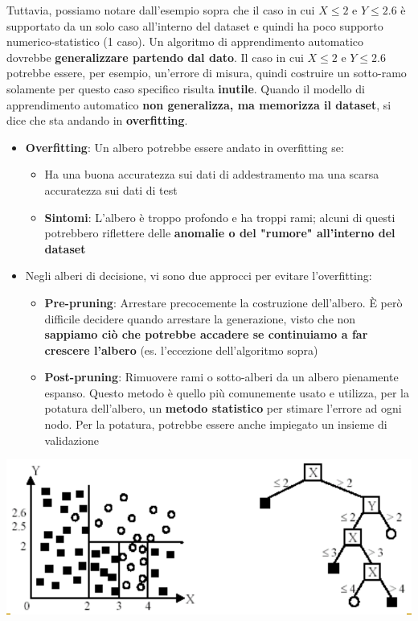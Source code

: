 \documentclass[12pt]{article}
\begin{document}
Tuttavia, possiamo notare dall'esempio sopra che il caso in cui $X \leq 2$ e $Y \leq 2.6$ è supportato da un solo caso all'interno del dataset e quindi
ha poco supporto numerico-statistico (1 caso). Un algoritmo di apprendimento automatico dovrebbe \textbf{generalizzare partendo dal dato}. Il caso in cui $X \leq 2$ e $Y \leq 2.6$ potrebbe essere, per esempio,
un'errore di misura, quindi costruire un sotto-ramo solamente per questo caso specifico risulta \textbf{inutile}.
Quando il modello di apprendimento automatico \textbf{non generalizza, ma memorizza il dataset}, si dice che sta andando in \textbf{overfitting}.
\begin{itemize}
    \item \textbf{Overfitting}: Un albero potrebbe essere andato in overfitting se:
    \begin{itemize}
        \item Ha una buona accuratezza sui dati di addestramento ma una scarsa accuratezza sui dati di test
        \item \textbf{Sintomi}: L'albero è troppo profondo e ha troppi rami; alcuni di questi potrebbero riflettere delle \textbf{anomalie o del "rumore" all'interno del dataset}
    \end{itemize}
    \item Negli alberi di decisione, vi sono due approcci per evitare l'overfitting:
    \begin{itemize}
        \item \textbf{Pre-pruning}: Arrestare precocemente la costruzione dell'albero. È però difficile decidere quando arrestare la generazione, visto che non \textbf{sappiamo ciò che potrebbe accadere se continuiamo a far crescere l'albero} (es. l'eccezione dell'algoritmo sopra)
        \item \textbf{Post-pruning}: Rimuovere rami o sotto-alberi da un albero pienamente espanso. Questo metodo è quello più comunemente usato e utilizza, per la potatura dell'albero, un \textbf{metodo statistico} per stimare l'errore ad ogni nodo. Per la potatura, potrebbe essere anche impiegato un insieme di validazione 
    \end{itemize}
\end{itemize}
\begin{center}
    \includegraphics[width =0.70\linewidth]{Images/76.PNG}
\end{center}
\end{document}
